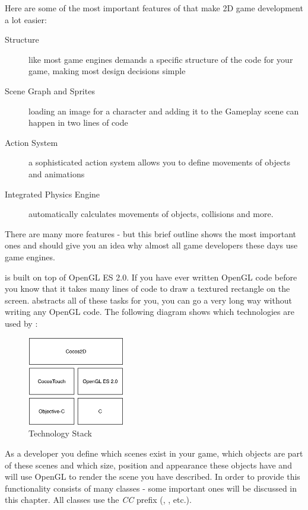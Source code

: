Here are some of the most important features of \cocos{} that make 2D game
development a lot easier:
\begin{description}
  \item[Structure] like most game engines \cocos{} demands a specific structure
  of the code for your game, making most design decisions simple
  \item[Scene Graph and Sprites] loading an image for a character and adding it
  to the Gameplay scene can happen in two lines of code
  \item[Action System] a sophisticated action system allows you to define
  movements of objects and animations
  \item[Integrated Physics Engine] automatically calculates movements of
  objects, collisions and more.
\end{description}
There are many more features - but this brief outline shows the most
important ones and should give you an idea why almost all game developers these
days use game engines. 

\cocos{} is built on top of OpenGL ES 2.0. If you have ever written OpenGL code
before you know that it takes many lines of code to draw a textured rectangle on
the screen. \cocos{} abstracts all of these tasks for you, you can go a very
long way without writing any OpenGL code. The following diagram shows which
technologies are used by \cocos{}:

\begin{figure}[H]
		\centering
		\includegraphics[width=120pt]{images/cocos2d/TechnologyStack.png}     
		\caption{\cocos{} Technology Stack}
\end{figure}

As a \cocos{} developer you define which scenes exist in your game, which
objects are part of these scenes and which size, position and appearance these
objects have and \cocos{} will use OpenGL to render the scene you have
described. In order to provide this functionality \cocos{} consists of many
classes - some important ones will be discussed in this chapter. All \cocos{}
classes use the \textit{CC} prefix (\ccscene{}, \ccnode{}, etc.).

